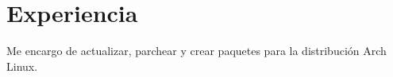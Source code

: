 \documentclass[10pt, a4paper]{moderncv}
\begin{document}
\section{Experiencia}
{
	Me encargo de actualizar, parchear y crear paquetes para la distribución
	Arch Linux.
}

\end{document}
